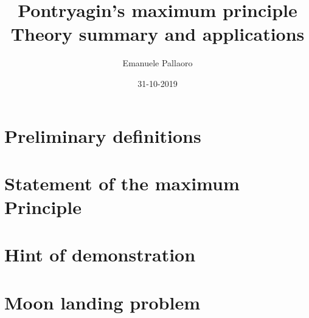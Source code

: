 \documentclass[14pt]{article}
\title{%
	Pontryagin's maximum principle\\
	\large Theory summary and applications
}
\author{Emanuele Pallaoro}
\date{31-10-2019}
\numberwithin{equation}{section}
\begin{document}
\maketitle
\pagestyle{plain}

\section{Preliminary definitions}

\section{Statement of the maximum Principle}

\section{Hint of demonstration}


\section{Moon landing problem}
\end{document}
